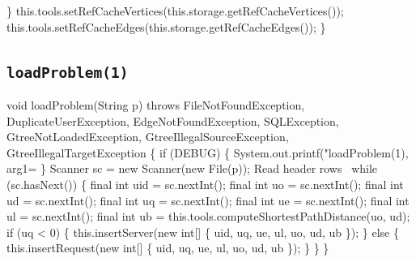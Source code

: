   \}
  this.tools.setRefCacheVertices(this.storage.getRefCacheVertices());
  this.tools.setRefCacheEdges(this.storage.getRefCacheEdges());
\}
\nwendcode{}\nwdocspar

\subsection{\texttt{loadProblem(1)}}
\nwenddocs{}\endmoddef{}
void loadProblem(String p)
throws FileNotFoundException, DuplicateUserException, EdgeNotFoundException, SQLException,
       GtreeNotLoadedException, GtreeIllegalSourceException, GtreeIllegalTargetException \{
  if (DEBUG) \{
    System.out.printf("loadProblem(1), arg1=%
  \}
  Scanner sc = new Scanner(new File(p));
  \LA{}Read header rows~{\nwtagstyle{}}\RA{}
  while (sc.hasNext()) \{
    final int uid = sc.nextInt();
    final int  uo = sc.nextInt();
    final int  ud = sc.nextInt();
    final int  uq = sc.nextInt();
    final int  ue = sc.nextInt();
    final int  ul = sc.nextInt();
    final int  ub = this.tools.computeShortestPathDistance(uo, ud);
    if (uq < 0) \{
      this.insertServer(new int[] \{ uid, uq, ue, ul, uo, ud, ub \});
    \} else \{
      this.insertRequest(new int[] \{ uid, uq, ue, ul, uo, ud, ub \});
    \}
  \}
\}
\eatline
{}\nwendcode{}\nwdocspar

